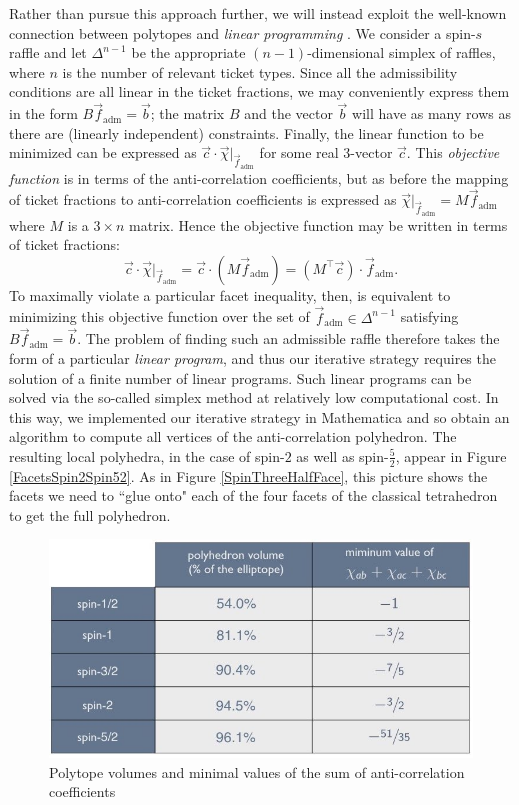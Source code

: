 Rather than pursue this approach further, we will instead exploit the well-known connection between polytopes and \emph{linear programming} \citep{Dantzig and Thapa 1997, Dantzig and Thapa 2003}. We consider a spin-$s$ raffle and let $\Delta^{n-1}$ be the appropriate $(n-1)$-dimensional simplex of raffles, where $n$ is the number of relevant ticket types. Since all the admissibility conditions are all linear in the ticket fractions, we may conveniently express them in the form $B\vec{f}_{\mathrm{adm}}=\vec{b}$; the matrix $B$ and the vector $\vec{b}$ will have as many rows as there are (linearly independent) constraints. Finally, the linear function to be minimized can be expressed as $\vec{c}\cdot \vec{\chi}|_{\vec{f}_{\mathrm{adm}}}$ for some real 3-vector $\vec{c}$. This \emph{objective function} is in terms of the anti-correlation coefficients, but as before the mapping of ticket fractions to anti-correlation coefficients is expressed as $\vec{\chi}|_{\vec{f}_{\mathrm{adm}}}=M\vec{f}_{\mathrm{adm}}$ where $M$ is a $3\times n$ matrix. Hence the objective function may be written in terms of ticket fractions:
\begin{equation}
    \vec{c}\cdot \vec{\chi}|_{\vec{f}_{\mathrm{adm}}}=\vec{c}\cdot (M\vec{f}_{\mathrm{adm}})=(M^\top \vec{c})\cdot \vec{f}_{\mathrm{adm}}.
\end{equation}
To maximally violate a particular facet inequality, then, is equivalent to minimizing this objective function over the set of $\vec{f}_{\mathrm{adm}}\in \Delta^{n-1}$ satisfying $B\vec{f}_{\mathrm{adm}}=\vec{b}$. The problem of finding such an admissible raffle therefore takes the form of a particular \emph{linear program},  and thus our iterative strategy requires the solution of a finite number of linear programs. Such linear programs can be solved via the so-called simplex method at relatively low computational cost. In this way, we implemented our iterative strategy in Mathematica and so obtain an algorithm to compute all vertices of the anti-correlation polyhedron. The resulting local polyhedra, in the case of spin-$2$ as well as spin-$\frac52$, appear in Figure \ref{FacetsSpin2Spin52}. As in Figure \ref{SpinThreeHalfFace}, this picture shows the facets we need to ``glue onto" each of the four facets of the classical tetrahedron to get the full polyhedron.

\begin{figure}[ht]
 \centering
   \includegraphics[width=4.5in]{polytopevolume.jpeg} 
   \caption{Polytope volumes and minimal values of the sum of anti-correlation coefficients}
   \label{polytopevolume}
\end{figure}

